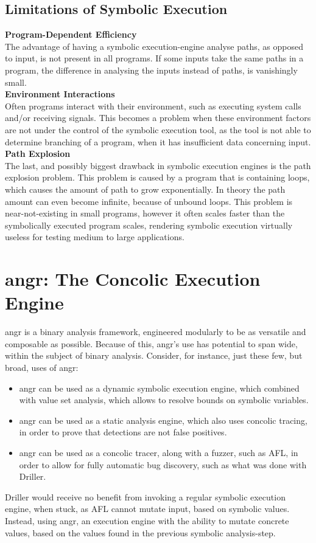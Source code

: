 \documentclass[a4paper]{article}
\newcommand{\tbf}[1]{\textbf{#1}}
\newcommand{\subsubsubsection}[1]{\tbf{#1}\\}
\begin{document}
\subsection{Limitations of Symbolic Execution}
\subsubsubsection{Program-Dependent Efficiency}
The advantage of having a symbolic execution-engine analyse paths, as opposed to input, is not present in all programs. If some inputs take the same paths in a program, the difference in analysing the inputs instead of paths, is vanishingly small.\\
\subsubsubsection{Environment Interactions}
Often programs interact with their environment, such as executing system calls and/or receiving signals. This becomes a problem when these environment factors are not under the control of the symbolic execution tool, as the tool is not able to determine branching of a program, when it has insufficient data concerning input.\\
\subsubsubsection{Path Explosion}
The last, and possibly biggest drawback in symbolic execution engines is the path explosion problem. This problem is caused by a program that is containing loops, which causes the amount of path to grow exponentially. In theory the path amount can even become infinite, because of unbound loops. This problem is near-not-existing in small programs, however it often scales faster than the symbolically executed program scales, rendering symbolic execution virtually useless for testing medium to large applications.
\section{angr: The Concolic Execution Engine}
angr is a binary analysis framework, engineered modularly to be as versatile and composable as possible. Because of this, angr's use has potential to span wide, within the subject of binary analysis. Consider, for instance, just these few, but broad, uses of angr:
\begin{itemize}
	\item angr can be used as a dynamic symbolic execution engine, which combined with value set analysis, which allows to resolve bounds on symbolic variables.
	\item angr can be used as a static analysis engine, which also uses concolic tracing, in order to prove that detections are not false positives.
	\item angr can be used as a concolic tracer, along with a fuzzer, such as AFL, in order to allow for fully automatic bug discovery, such as what was done with Driller.
\end{itemize}
Driller would receive no benefit from invoking a regular symbolic execution engine, when stuck, as AFL cannot mutate input, based on symbolic values. Instead, using angr, an execution engine with the ability to mutate concrete values, based on the values found in the previous symbolic analysis-step.
\end{document}
